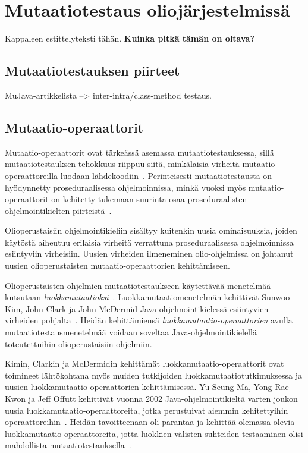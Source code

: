 \documentclass[finnish, grading]{tktltiki2}
\theoremstyle{definition}
\theoremstyle{remark}
\begin{document}
\section{Mutaatiotestaus oliojärjestelmissä}

Kappaleen estittelyteksti tähän. \textbf{Kuinka pitkä tämän on oltava?} 

\subsection{Mutaatiotestauksen piirteet}

MuJava-artikkelista --> inter-intra/class-method testaus.

\subsection{Mutaatio-operaattorit}

Mutaatio-operaattorit ovat tärkeässä asemassa mutaatiotestauksessa, sillä mutaatiotestauksen tehokkuus riippuu siitä, minkälaisia virheitä mutaatio-operaattoreilla luodaan lähdekoodiin~\cite[s. 352]{Ma:Kwon:Offutt:2002}. Perinteisesti mutaatiotestausta on hyödynnetty proseduraalisessa ohjelmoinnissa, minkä vuoksi myös mutaatio-operaattorit on kehitetty tukemaan suurinta osaa proseduraalisten ohjelmointikielten piirteistä~\cite[s. 352]{Ma:Kwon:Offutt:2002}. 

Olioperustaisiin ohjelmointikieliin sisältyy kuitenkin uusia ominaisuuksia, joiden käytöstä aiheutuu erilaisia virheitä verrattuna proseduraalisessa ohjelmoinnissa esiintyviin virheisiin. Uusien virheiden ilmeneminen olio-ohjelmissa on johtanut uusien olioperustaisten mutaatio-operaattorien kehittämiseen.  

Olioperustaisten ohjelmien mutaatiotestaukseen käytettävää menetelmää kutsutaan \textit{luokkamutaatioksi}~\cite{Kim:Clark:McDermid:2000}. Luokkamutaatiomenetelmän kehittivät Sunwoo Kim, John Clark ja John McDermid Java-oh\-jel\-moin\-ti\-kie\-les\-sä esiintyvien virheiden pohjalta~\cite{Kim:Clark:McDermid:2000}. Heidän kehittämiensä \textit{luokkamutaatio-operaattorien} avulla mutaatiotestausmenetelmää voidaan soveltaa Java-ohjelmointikielellä toteutettuihin olioperustaisiin ohjelmiin.

Kimin, Clarkin ja McDermidin kehittämät luokkamutaatio-operaattorit ovat toimineet lähtökohtana myös muiden tutkijoiden luokkamutaatiotutkimuksessa ja uusien luokkamutaatio-operaattorien kehittämisessä. Yu Seung Ma, Yong Rae Kwon ja Jeff Offutt kehittivät vuonna 2002 Java-oh\-jel\-moin\-ti\-kiel\-tä varten joukon uusia luokkamutaatio-operaattoreita, jotka perustuivat aiemmin kehitettyihin operaattoreihin~\cite[s. 352]{Ma:Kwon:Offutt:2002}. Heidän tavoitteenaan oli parantaa ja kehittää olemassa olevia luokkamutaatio-operaattoreita, jotta luokkien välisten suhteiden testaaminen olisi mahdollista mutaatiotestauksella~\cite[s. 362]{Ma:Kwon:Offutt:2002}.
\end{document}
